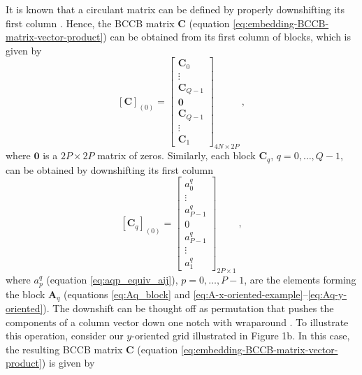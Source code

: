 \documentclass[manuscript,revised]{geophysics}
\begin{document}
It is known that a circulant matrix can be defined by properly downshifting 
its first column \citep[][ p. 221]{golub-vanloan2013}. Hence, the BCCB matrix $\mathbf{C}$ 
(equation \ref{eq:embedding-BCCB-matrix-vector-product}) can be obtained from its 
first column of blocks, which is given by
\begin{equation}
\left[\mathbf{C} \right]_{(0)} = 
	\begin{bmatrix}
	\mathbf{C}_{0} \\
	\vdots \\
	\mathbf{C}_{Q-1} \\
	\mathbf{0} \\
	\mathbf{C}_{Q-1} \\
	\vdots \\
	\mathbf{C}_{1}
	\end{bmatrix}_{4N \times 2P} \: ,
	\label{eq:C-first-column-blocks}
\end{equation}
where $\mathbf{0}$ is a $2P \times 2P$ matrix of zeros. Similarly, each block 
$\mathbf{C}_{q}$, $q = 0, \dots, Q-1$, can be obtained by downshifting its first 
column
\begin{equation}
\left[\mathbf{C}_{q} \right]_{(0)} = 
	\begin{bmatrix}
		a^{q}_{0} \\
		\vdots \\
		a^{q}_{P-1} \\
		0 \\
		a^{q}_{P-1} \\
		\vdots \\
		a^{q}_{1}
	\end{bmatrix}_{2P \times 1} \: ,
	\label{eq:Cq-first-column}
\end{equation}
where $a^{q}_{p}$ (equation \ref{eq:aqp_equiv_aij}), $p = 0, \dots, P-1$, are the elements 
forming the block $\mathbf{A}_{q}$ (equations \ref{eq:Aq_block} and 
\ref{eq:A-x-oriented-example}--\ref{eq:Aq-y-oriented}).
The downshift can be thought off as permutation that pushes the components of a column vector 
down one notch with wraparound \citep[][ p. 20]{golub-vanloan2013}.
To illustrate this operation, consider our $y$-oriented grid illustrated in Figure 1b. In this case, the resulting 
BCCB matrix $\mathbf{C}$ (equation \ref{eq:embedding-BCCB-matrix-vector-product}) is given by 
\end{document}
